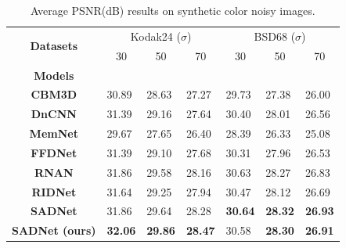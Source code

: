 \begin{table}[b!]
\centering
\caption{Average PSNR(dB) results on synthetic color noisy images.}
\label{tab:synt}
\begin{tabular}{c|lll|lll}
\multirow{2}{*}{\textbf{Datasets}} & \multicolumn{3}{c|}{Kodak24 ($\sigma$)}                                   & \multicolumn{3}{c}{BSD68 ($\sigma$)}                                    \\ \cline{2-7} 
                                   & \multicolumn{1}{c}{30} & \multicolumn{1}{c}{50} & \multicolumn{1}{c|}{70} & \multicolumn{1}{c}{30} & \multicolumn{1}{c}{50} & \multicolumn{1}{c}{70} \\ \hline
\textbf{Models}                    &                        &                        &                         &                        &                        &                        \\ \hline
\textbf{CBM3D} \cite{4378954}            & 30.89                  & 28.63                  & 27.27                   & 29.73                  & 27.38                  & 26.00                  \\
\textbf{DnCNN} \cite{zhang2017beyond}            & 31.39                  & 29.16                  & 27.64                   & 30.40                  & 28.01                  & 26.56                  \\
\textbf{MemNet} \cite{8237748}           & 29.67                  & 27.65                  & 26.40                   & 28.39                  & 26.33                  & 25.08                  \\
\textbf{FFDNet} \cite{zhang2018ffdnet}           & 31.39                  & 29.10                  & 27.68                   & 30.31                  & 27.96                  & 26.53                  \\
\textbf{RNAN} \cite{zhang2018residual}             & 31.86                  & 29.58                  & 28.16                   & 30.63                  & 28.27                  & 26.83                  \\
\textbf{RIDNet} \cite{anwar2019ridnet}          & 31.64                  & 29.25                  & 27.94                   & 30.47                  & 28.12                  & 26.69                  \\
\textbf{SADNet} \cite{10.1007/978-3-030-58577-8_11}            & 31.86                  & 29.64                  & 28.28                   & \textbf{30.64}                  & \textbf{28.32}                  & \textbf{26.93}                  \\
\textbf{SADNet (ours)}             & \textbf{32.06}                  & \textbf{29.86}                  & \textbf{28.47}                   & 30.58                  & \textbf{28.30}                  & \textbf{26.91}                 
\end{tabular}
\end{table}
  


